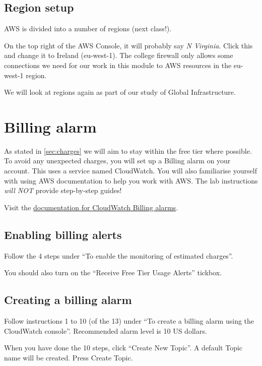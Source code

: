 \subsection{Region setup}
\label{sec:region-setup}

AWS is divided into a number of regions (next class!).

On the top right of the AWS Console, it will probably say \textit{N Virginia}.
Click this and change it to Ireland (eu-west-1).
The college firewall only allows some connections we need for our work in this module to AWS resources in the eu-west-1 region.

We will look at regions again as part of our study of Global Infrastructure.

\section{Billing alarm}

As stated in \autoref{sec:charges} we will aim to stay within the free tier where possible.
To avoid any unexpected charges, you will set up a Billing alarm on your account.
This uses a service named CloudWatch.
You will also familiarise yourself with using AWS documentation to help you work with AWS.
The lab instructions \textit{will NOT} provide step-by-step guides!

Visit the \href{https://docs.aws.amazon.com/AmazonCloudWatch/latest/monitoring/monitor_estimated_charges_with_cloudwatch.html}{documentation for CloudWatch Billing alarms}.

\subsection{Enabling billing alerts}

Follow the 4 steps under ``To enable the monitoring of estimated charges''.

You should also turn on the ``Receive Free Tier Usage Alerts'' tickbox.

\subsection{Creating a billing alarm}

Follow instructions 1 to 10 (of the 13) under ``To create a billing alarm using the CloudWatch console''.
Recommended alarm level is 10 US dollars.

When you have done the 10 steps, click ``Create New Topic''.
A default Topic name will be created.
Press Create Topic.

